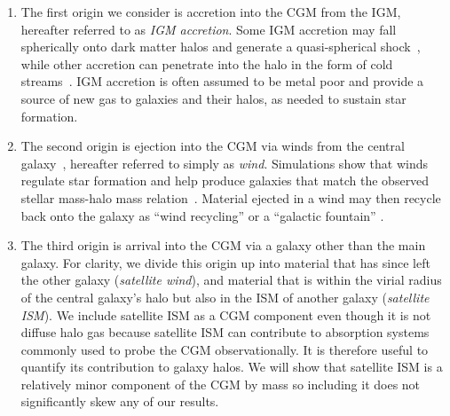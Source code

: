 \documentclass[fleqn,usenatbib]{mnras}
\begin{document}
\begin{enumerate}

\item The first origin we consider is accretion into the CGM from the IGM, hereafter referred to as \textit{IGM accretion}.
Some IGM accretion may fall spherically onto dark matter halos and generate a quasi-spherical shock~\citep{White1978,White1991}, while other accretion can penetrate into the halo in the form of cold streams~\citep[e.g.][]{Keres2005,Keres2009a,2009Natur.457..451D}.
IGM accretion is often assumed to be metal poor and provide a source of new gas to galaxies and their halos, as needed to sustain star formation.

\item The second origin is ejection into the CGM via winds from the central galaxy~\citep[e.g.][]{Heckman2017}, hereafter referred to simply as \textit{wind}.
Simulations show that winds regulate star formation and help produce galaxies that match the observed stellar mass-halo mass relation~\citep[e.g.][]{2007ApJ...655L..17B,2011MNRAS.416.1354D,Angles-Alcazar2014,Somerville2015}.
Material ejected in a wind may then recycle back onto the galaxy as ``wind recycling'' or a ``galactic fountain'' \citep[e.g.][]{Shapiro1976,Bregman1980,Oppenheimer2010,Ford2014,Angles-Alcazar2017}.

\item The third origin is arrival into the CGM via a galaxy other than the main galaxy.
For clarity, we divide this origin up into material that has since left the other galaxy (\textit{satellite wind}), and material that is within the virial radius of the central galaxy's halo but also in the ISM of another galaxy (\textit{satellite ISM}).
We include satellite ISM as a CGM component even though it is not diffuse halo gas because satellite ISM can contribute to absorption systems commonly used to probe the CGM observationally. 
It is therefore useful to quantify its contribution to galaxy halos. 
We will show that satellite ISM is a relatively minor component of the CGM by mass so including it does not significantly skew any of our results.


\end{enumerate}
\end{document}

